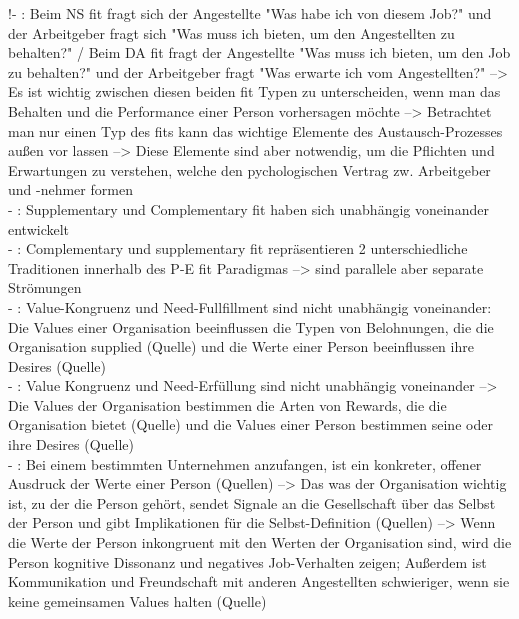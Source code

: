 !- \cite[S. 3]{caplan:1987}: Beim NS fit fragt sich der Angestellte "Was habe ich von diesem Job?" und der Arbeitgeber fragt sich "Was muss ich bieten, um den Angestellten zu behalten?" / Beim DA fit fragt der Angestellte "Was muss ich bieten, um den Job zu behalten?" und der Arbeitgeber fragt "Was erwarte ich vom Angestellten?" --> Es ist wichtig zwischen diesen beiden fit Typen zu unterscheiden, wenn man das Behalten und die Performance einer Person vorhersagen möchte --> Betrachtet man nur einen Typ des fits kann das wichtige Elemente des Austausch-Prozesses außen vor lassen --> Diese Elemente sind aber notwendig, um die Pflichten und Erwartungen zu verstehen, welche den pychologischen Vertrag zw. Arbeitgeber und -nehmer formen \\
- \cite[S. 1]{edwards:2004}: Supplementary und Complementary fit haben sich unabhängig voneinander entwickelt \\
- \cite[S. 1]{edwards:2004}: Complementary und supplementary fit repräsentieren 2 unterschiedliche Traditionen innerhalb des P-E fit Paradigmas --> sind parallele aber separate Strömungen \\
- \cite[S. 3]{edwards:2004}: Value-Kongruenz und Need-Fullfillment sind nicht unabhängig voneinander: Die Values einer Organisation beeinflussen die Typen von Belohnungen, die die Organisation supplied (Quelle) und die Werte einer Person beeinflussen ihre Desires (Quelle) \\
- \cite[S. 3]{edwards:2004}: Value Kongruenz und Need-Erfüllung sind nicht unabhängig voneinander --> Die Values der Organisation bestimmen die Arten von Rewards, die die Organisation bietet (Quelle) und die Values einer Person bestimmen seine oder ihre Desires (Quelle) \\
- \cite[S. 3]{edwards:2004}: Bei einem bestimmten Unternehmen anzufangen, ist ein konkreter, offener Ausdruck der Werte einer Person (Quellen) --> Das was der Organisation wichtig ist, zu der die Person gehört, sendet Signale an die Gesellschaft über das Selbst der Person und gibt Implikationen für die Selbst-Definition (Quellen) --> Wenn die Werte der Person inkongruent mit den Werten der Organisation sind, wird die Person kognitive Dissonanz und negatives Job-Verhalten zeigen; Außerdem ist Kommunikation und Freundschaft mit anderen Angestellten schwieriger, wenn sie keine gemeinsamen Values halten (Quelle)\\

